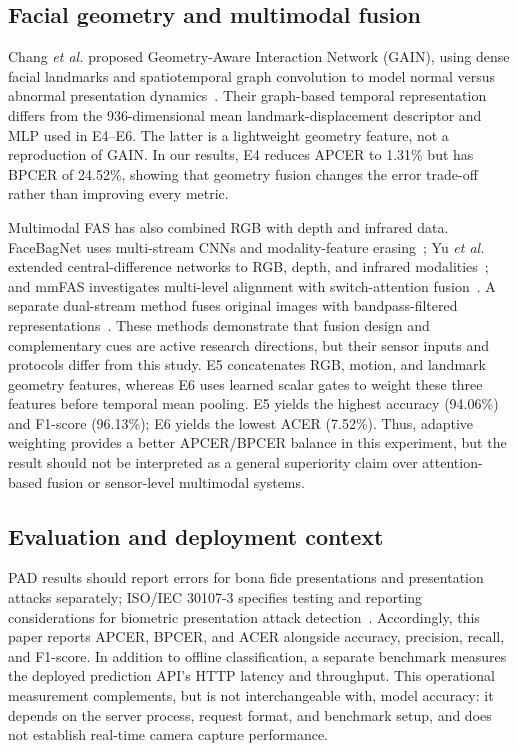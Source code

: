 \documentclass[a4paper,conference]{IEEEtran}
\begin{document}
\subsection{Facial geometry and multimodal fusion}
Chang \emph{et al.} proposed Geometry-Aware Interaction Network (GAIN), using dense facial landmarks and spatiotemporal graph convolution to model normal versus abnormal presentation dynamics~\cite{chang2023geometry}. Their graph-based temporal representation differs from the 936-dimensional mean landmark-displacement descriptor and MLP used in E4--E6. The latter is a lightweight geometry feature, not a reproduction of GAIN. In our results, E4 reduces APCER to 1.31\% but has BPCER of 24.52\%, showing that geometry fusion changes the error trade-off rather than improving every metric.

Multimodal FAS has also combined RGB with depth and infrared data. FaceBagNet uses multi-stream CNNs and modality-feature erasing~\cite{shen2019facebagnet}; Yu \emph{et al.} extended central-difference networks to RGB, depth, and infrared modalities~\cite{yu2020multimodal}; and mmFAS investigates multi-level alignment with switch-attention fusion~\cite{chen2025mmfas}. A separate dual-stream method fuses original images with bandpass-filtered representations~\cite{zeng2023bandpass}. These methods demonstrate that fusion design and complementary cues are active research directions, but their sensor inputs and protocols differ from this study. E5 concatenates RGB, motion, and landmark geometry features, whereas E6 uses learned scalar gates to weight these three features before temporal mean pooling. E5 yields the highest accuracy (94.06\%) and F1-score (96.13\%); E6 yields the lowest ACER (7.52\%). Thus, adaptive weighting provides a better APCER/BPCER balance in this experiment, but the result should not be interpreted as a general superiority claim over attention-based fusion or sensor-level multimodal systems.

\subsection{Evaluation and deployment context}
PAD results should report errors for bona fide presentations and presentation attacks separately; ISO/IEC 30107-3 specifies testing and reporting considerations for biometric presentation attack detection~\cite{iso30107}. Accordingly, this paper reports APCER, BPCER, and ACER alongside accuracy, precision, recall, and F1-score. In addition to offline classification, a separate benchmark measures the deployed prediction API's HTTP latency and throughput. This operational measurement complements, but is not interchangeable with, model accuracy: it depends on the server process, request format, and benchmark setup, and does not establish real-time camera capture performance.
\end{document}
